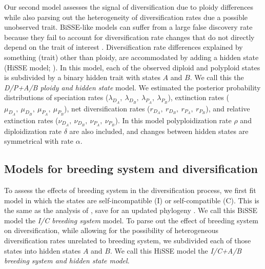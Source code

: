 Our second model assesses the signal of diversification due to ploidy differences while also parsing out the heterogeneity of diversification rates due a possible unobserved trait.
BiSSE-like models can suffer from a large false discovery rate because they fail to account for diversification rate changes that do not directly depend on the trait of interest \citep{rabosky_2015, beaulieu_2016}.
Diversification rate differences explained by something (trait) other than ploidy, are accommodated by adding a hidden state (HiSSE model; \citealt{beaulieu_2016}). %
In this model, each of the observed diploid and polyploid states is subdivided by a binary hidden trait with states $A$ and $B$.
We call this the \textit{D/P+A/B ploidy and hidden state} model. 
We estimated the posterior probability distributions of speciation rates ($\lambda_{D_A},\ \lambda_{D_B},\ \lambda_{P_A},\ \lambda_{P_B}$), extinction rates ($\mu_{D_A},\ \mu_{D_B},\ \mu_{P_A},\ \mu_{P_B}$), net diversification rates ($r_{D_A},\ r_{D_B},\ r_{P_A},\ r_{P_B}$), and relative extinction rates ($\nu_{D_A},\ \nu_{D_B},\ \nu_{P_A},\ \nu_{P_B}$).
In this model polyploidization rate $\rho$ and diploidization rate $\delta$ are also included, and changes between hidden states are symmetrical with rate $\alpha$. %

\subsection{Models for breeding system and diversification}

To assess the effects of breeding system in the diversification process, we first fit model in which the states are self-incompatible (I) or self-compatible (C).
This is the same as the analysis of \citet{goldberg_2010}, save for an updated phylogeny \citep{sarkinen_2013}.
We call this BiSSE model the \textit{I/C breeding system} model. 
To parse out the effect of breeding system on diversification, while allowing for the possibility of heterogeneous diversification rates unrelated to breeding system, we subdivided each of those states into hidden states $A$ and $B$.
We call this HiSSE model the \textit{I/C+A/B breeding system and hidden state model}. 

